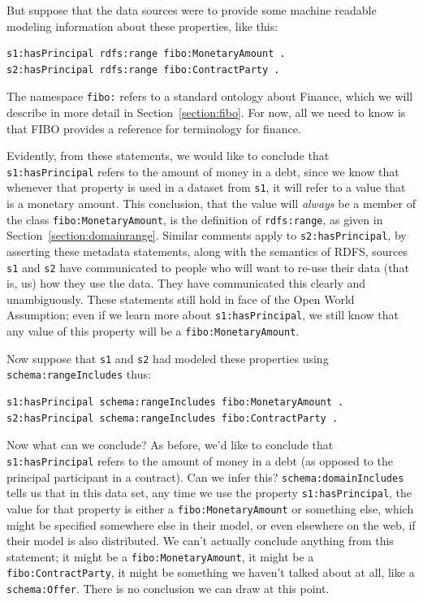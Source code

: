 But suppose that the data sources were to provide some machine readable modeling information about these properties, 
like this:

\begin{lstlisting}
s1:hasPrincipal rdfs:range fibo:MonetaryAmount .
s2:hasPrincipal rdfs:range fibo:ContractParty .
\end{lstlisting}

The namespace \texttt{fibo:} refers to a standard ontology about Finance, which we will describe in more detail
in Section~\ref{section:fibo}. For now, all we need to know is that FIBO provides a reference for terminology
for finance.   

Evidently, from these statements, we would like to conclude that \texttt{s1:hasPrincipal} refers to the amount of money 
in a debt, since we know that whenever that property is used in a dataset from \texttt{s1}, it will refer to a value that 
is a monetary amount.  This conclusion, that the value will \emph{always} be a member of the class \texttt{fibo:MonetaryAmount}, 
is the definition of \texttt{rdfs:range}, as given in Section~\ref{section:domainrange}.  Similar comments apply
to \texttt{s2:hasPrincipal}, by asserting these metadata statements, along with the semantics of RDFS, sources \texttt{s1}
and \texttt{s2} have communicated to people who will want to re-use their data (that is, us) how they use the 
data.  They have communicated this clearly and unambiguously.  These statements still hold in face of the Open World Assumption;
even if we learn more about \texttt{s1:hasPrincipal}, we still know that any value of this property will be a \texttt{fibo:MonetaryAmount}. 

Now suppose that \texttt{s1} and \texttt{s2} had modeled these properties using  \texttt{schema:rangeIncludes} thus:

\begin{lstlisting}
s1:hasPrincipal schema:rangeIncludes fibo:MonetaryAmount .
s2:hasPrincipal schema:rangeIncludes fibo:ContractParty .
\end{lstlisting}

Now what can we conclude?  As before, we'd like to conclude that \texttt{s1:hasPrincipal} refers to the amount of money 
in a debt (as opposed to the principal participant in a contract).  Can we infer this?  \texttt{schema:domainIncludes} tells 
us that in this data set, any time we use the property \texttt{s1:hasPrincipal}, the value for that property is either
a \texttt{fibo:MonetaryAmount} or something else, which might be specified somewhere else in their model, 
or even elsewhere on the web, if their model is also distributed.  We can't actually
conclude anything from this statement; it might be a \texttt{fibo:MonetaryAmount}, it might be a \texttt{fibo:ContractParty}, it 
might be something we haven't talked about at all, like a \texttt{schema:Offer}.  There is no conclusion we can draw at this
point. 

